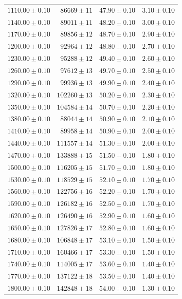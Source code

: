 \documentclass[a4paper,11pt]{article}
\begin{document}
\begin{longtable}{r r r r}
  $1110.00 \pm 0.10$ & $86669 \pm 11$ & $47.90 \pm 0.10$ & $3.10 \pm 0.10$ \\
  $1140.00 \pm 0.10$ & $89011 \pm 11$ & $48.20 \pm 0.10$ & $3.00 \pm 0.10$ \\
  $1170.00 \pm 0.10$ & $89856 \pm 12$ & $48.70 \pm 0.10$ & $2.90 \pm 0.10$ \\
  $1200.00 \pm 0.10$ & $92964 \pm 12$ & $48.80 \pm 0.10$ & $2.70 \pm 0.10$ \\
  $1230.00 \pm 0.10$ & $95288 \pm 12$ & $49.40 \pm 0.10$ & $2.60 \pm 0.10$ \\
  $1260.00 \pm 0.10$ & $97612 \pm 13$ & $49.70 \pm 0.10$ & $2.50 \pm 0.10$ \\
  $1290.00 \pm 0.10$ & $99936 \pm 13$ & $49.90 \pm 0.10$ & $2.40 \pm 0.10$ \\
  $1320.00 \pm 0.10$ & $102260 \pm 13$ & $50.20 \pm 0.10$ & $2.30 \pm 0.10$ \\
  $1350.00 \pm 0.10$ & $104584 \pm 14$ & $50.70 \pm 0.10$ & $2.20 \pm 0.10$ \\
  $1380.00 \pm 0.10$ & $88044 \pm 14$ & $50.90 \pm 0.10$ & $2.10 \pm 0.10$ \\
  $1410.00 \pm 0.10$ & $89958 \pm 14$ & $50.90 \pm 0.10$ & $2.00 \pm 0.10$ \\
  $1440.00 \pm 0.10$ & $111557 \pm 14$ & $51.30 \pm 0.10$ & $2.00 \pm 0.10$ \\
  $1470.00 \pm 0.10$ & $133888 \pm 15$ & $51.50 \pm 0.10$ & $1.80 \pm 0.10$ \\
  $1500.00 \pm 0.10$ & $116205 \pm 15$ & $51.70 \pm 0.10$ & $1.80 \pm 0.10$ \\
  $1530.00 \pm 0.10$ & $118529 \pm 15$ & $52.10 \pm 0.10$ & $1.70 \pm 0.10$ \\
  $1560.00 \pm 0.10$ & $122756 \pm 16$ & $52.20 \pm 0.10$ & $1.70 \pm 0.10$ \\
  $1590.00 \pm 0.10$ & $126182 \pm 16$ & $52.50 \pm 0.10$ & $1.70 \pm 0.10$ \\
  $1620.00 \pm 0.10$ & $126490 \pm 16$ & $52.90 \pm 0.10$ & $1.60 \pm 0.10$ \\
  $1650.00 \pm 0.10$ & $127826 \pm 17$ & $52.80 \pm 0.10$ & $1.60 \pm 0.10$ \\
  $1680.00 \pm 0.10$ & $106848 \pm 17$ & $53.10 \pm 0.10$ & $1.50 \pm 0.10$ \\
  $1710.00 \pm 0.10$ & $160466 \pm 17$ & $53.30 \pm 0.10$ & $1.50 \pm 0.10$ \\
  $1740.00 \pm 0.10$ & $114005 \pm 17$ & $53.60 \pm 0.10$ & $1.40 \pm 0.10$ \\
  $1770.00 \pm 0.10$ & $137122 \pm 18$ & $53.50 \pm 0.10$ & $1.40 \pm 0.10$ \\
  $1800.00 \pm 0.10$ & $142848 \pm 18$ & $54.00 \pm 0.10$ & $1.30 \pm 0.10$ \\
\end{longtable}
\end{document}
